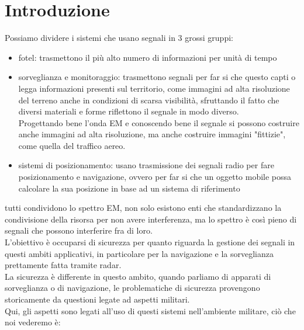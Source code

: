 \documentclass[oneside, 12pt]{extbook}
\begin{document}
\section{Introduzione}
Possiamo dividere i sistemi che usano segnali in 3 grossi gruppi:
\begin{itemize}
	\item fotel: trasmettono il più alto numero di informazioni per unità di tempo
	\item sorveglianza e monitoraggio: trasmettono segnali per far si che questo capti o legga informazioni presenti sul territorio, come immagini ad alta risoluzione del terreno anche in condizioni di scarsa visibilità, sfruttando il fatto che diversi materiali e forme riflettono il segnale in modo diverso.\\
	Progettando bene l'onda EM e conoscendo bene il segnale si possono costruire anche immagini ad alta risoluzione, ma anche costruire immagini "fittizie", come quella del traffico aereo. 
	\item sistemi di posizionamento: usano trasmissione dei segnali radio per fare posizionamento e navigazione, ovvero per far si che un oggetto mobile possa calcolare la sua posizione in base ad un sistema di riferimento
\end{itemize}
tutti condividono lo spettro EM, non solo esistono enti che standardizzano la condivisione della risorsa per non avere interferenza, ma lo spettro è così pieno di segnali che possono interferire fra di loro.
\\L'obiettivo è occuparsi di sicurezza per quanto riguarda la gestione dei segnali in questi ambiti applicativi, in particolare per la navigazione e la sorveglianza prettamente fatta tramite radar.
\\La sicurezza è differente in questo ambito, quando parliamo di apparati di sorveglianza o di navigazione, le problematiche di sicurezza provengono storicamente da questioni legate ad aspetti militari.
\\Qui, gli aspetti sono legati all'uso di questi sistemi nell'ambiente militare, ciò che noi vederemo è:
\end{document}
